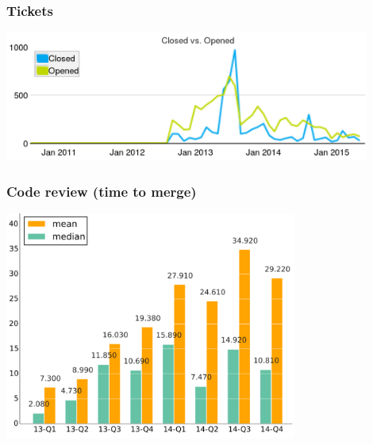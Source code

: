 \documentclass[17pt,aspectratio=169,hyperref=pdfusetitle]{beamer}
\begin{document}

\begin{frame}
\frametitle{Tickets}

\begin{center}
  \includegraphics[width=12cm]{figs/processes-tickets-closed-open}
\end{center}

\end{frame}


\begin{frame}
\frametitle{Code review (time to merge)}

\begin{center}
  \includegraphics[height=7.5cm]{figs/processes-crs-nova-time-to-merge}
\end{center}

\end{frame}

\end{document}
